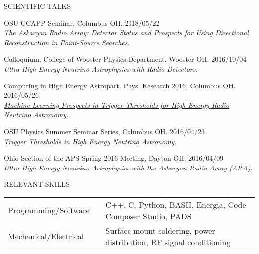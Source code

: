 \documentclass{resume} %
\begin{document}
\begin{rSection}{SCIENTIFIC TALKS}
\begin{etaremune}
\item OSU CCAPP Seminar, Columbus OH. \hfill 2018/05/22 \\
\href{http://ccapp.osu.edu/pastseminars.html#past}{\textit{The Askaryan Radio Array: Detector Status and Prospects for Using Directional Reconstruction in Point-Source Searches.}}

\item Colloquium, College of Wooster Physics Department, Wooster OH. \hfill 2016/10/04 \\
{\em Ultra-High Energy Neutrino Astrophysics with Radio Detectors.}

\item Computing in High Energy Astropart. Phys. Research 2016, Columbus OH. \hfill 2016/05/26 \\
\href{http://ccapp.osu.edu/workshops/CHEAPR2016/workshop.html}{\em Machine Learning Prospects in Trigger Thresholds for High Energy Radio Neutrino Astronomy.}

\item OSU Physics Summer Seminar Series, Columbus OH. \hfill 2016/04/23 \\
{\em Trigger Thresholds in High Energy Neutrino Astronomy.} 

\item Ohio Section of the APS Spring 2016 Meeting, Dayton OH. \hfill 2016/04/09 \\
\href{http://meetings.aps.org/Meeting/OSS16/Session/D3.6}{\em Ultra-High Energy Neutrino Astrophysics with the Askaryan Radio Array (ARA).} 
\end{etaremune}


\end{rSection}
\vspace{-0.10cm}
\begin{rSection}{RELEVANT SKILLS}
\begin{tabular}{@{}l l l@{}}
Programming/Software & & C++, C, Python, BASH, Energia, Code Composer Studio, PADS \\ 
Mechanical/Electrical & & Surface mount soldering, power distribution, RF signal conditioning  \\ 
\end{tabular}
\end{rSection}
\end{document}
